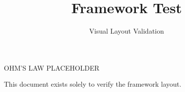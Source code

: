 \documentclass{bef}
\title{Framework Test}
\subtitle{Visual Layout Validation}
\begin{document}
\makeposter

\vspace*{6cm}

\begin{center}

{\Huge
OHM'S LAW PLACEHOLDER}

\vspace{1cm}

This document exists solely to verify the framework layout.

\end{center}
\end{document}
